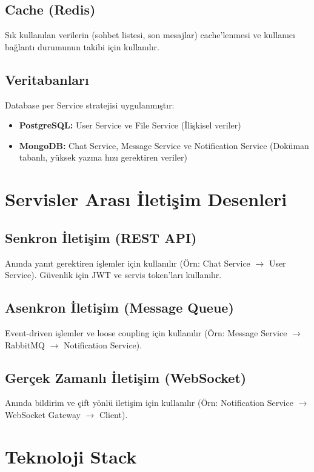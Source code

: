 \subsection{Cache (Redis)}
Sık kullanılan verilerin (sohbet listesi, son mesajlar) cache'lenmesi ve kullanıcı bağlantı durumunun takibi için kullanılır.

\subsection{Veritabanları}
Database per Service stratejisi uygulanmıştır:
\begin{itemize}
    \item \textbf{PostgreSQL:} User Service ve File Service (İlişkisel veriler)
    \item \textbf{MongoDB:} Chat Service, Message Service ve Notification Service (Doküman tabanlı, yüksek yazma hızı gerektiren veriler)
\end{itemize}

\section{Servisler Arası İletişim Desenleri}

\subsection{Senkron İletişim (REST API)}
Anında yanıt gerektiren işlemler için kullanılır (Örn: Chat Service $\rightarrow$ User Service). Güvenlik için JWT ve servis token'ları kullanılır.

\subsection{Asenkron İletişim (Message Queue)}
Event-driven işlemler ve loose coupling için kullanılır (Örn: Message Service $\rightarrow$ RabbitMQ $\rightarrow$ Notification Service).

\subsection{Gerçek Zamanlı İletişim (WebSocket)}
Anında bildirim ve çift yönlü iletişim için kullanılır (Örn: Notification Service $\rightarrow$ WebSocket Gateway $\rightarrow$ Client).

\section{Teknoloji Stack}

